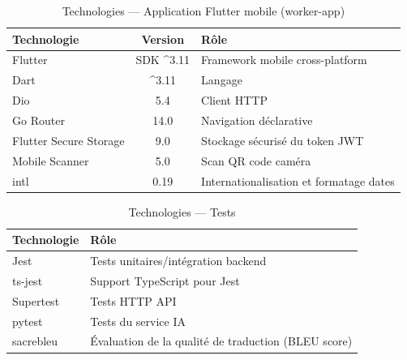 \begin{table}[H]
\centering
\caption{Technologies — Application Flutter mobile (worker-app)}
\label{tab:tech_flutter}
\begin{tabular}{|l|c|p{7cm}|}
\hline
\textbf{Technologie} & \textbf{Version} & \textbf{Rôle} \\
\hline
Flutter & SDK \^{}3.11 & Framework mobile cross-platform \\
\hline
Dart & \^{}3.11 & Langage \\
\hline
Dio & 5.4 & Client HTTP \\
\hline
Go Router & 14.0 & Navigation déclarative \\
\hline
Flutter Secure Storage & 9.0 & Stockage sécurisé du token JWT \\
\hline
Mobile Scanner & 5.0 & Scan QR code caméra \\
\hline
intl & 0.19 & Internationalisation et formatage dates \\
\hline
\end{tabular}
\end{table}

\begin{table}[H]
\centering
\caption{Technologies — Tests}
\label{tab:tech_tests}
\begin{tabular}{|l|p{10cm}|}
\hline
\textbf{Technologie} & \textbf{Rôle} \\
\hline
Jest & Tests unitaires/intégration backend \\
\hline
ts-jest & Support TypeScript pour Jest \\
\hline
Supertest & Tests HTTP API \\
\hline
pytest & Tests du service IA \\
\hline
sacrebleu & Évaluation de la qualité de traduction (BLEU score) \\
\hline
\end{tabular}
\end{table}

